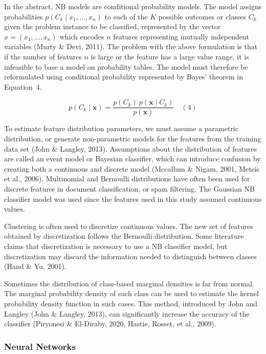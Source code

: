\documentclass[sn-mathphys-num]{sn-jnl}%
\begin{document}
In the abstract, NB models are conditional probability models. The model assigns probabilities $p(C_{k}\mid x_{1},\ldots, x_{n})$ to each of the $K$ possible outcomes or classes $C_{k}$ given the problem instance to be classified, represented by the vector $x = (x_{1},\ldots, x_{n})$ which encodes $n$ features representing mutually independent variables (Murty & Devi, 2011). The problem with the above formulation is that if the number of features $n$ is large or the feature has a large value range, it is infeasible to base a model on probability tables. The model must therefore be reformulated using conditional probability represented by Bayes' theorem in Equation~4.

\begin{equation}
	p(C_{k}\mid \mathbf{x})={\frac{p(C_{k})\ p(\mathbf{x} \mid C_{k})}{p(\mathbf{x})}}
	\quad\left(4\right)
\end{equation}

To estimate feature distribution parameters, we must assume a parametric distribution, or generate non-parametric models for the features from the training data set (John & Langley, 2013). Assumptions about the distribution of features are called an event model or Bayesian classifier, which can introduce confusion by creating both a continuous and discrete model (Mccallum & Nigam, 2001, Metsis et al., 2006). Multinomial and Bernoulli distributions have often been used for discrete features in document classification, or spam filtering. The Gaussian NB classifier model was used since the features used in this study assumed continuous values.

Clustering is often used to discretize continuous values. The new set of features obtained by discretization follows the Bernoulli distribution. Some literature claims that discretization is necessary to use a NB classifier model, but discretization may discard the information needed to distinguish between classes (Hand & Yu, 2001).

Sometimes the distribution of class-based marginal densities is far from normal. The marginal probability density of each class can be used to estimate the kernel probability density function in such cases. This method, introduced by John and Langley (John & Langley, 2013), can significantly increase the accuracy of the classifier (Piryonesi & El-Diraby, 2020, Hastie, Rosset, et al., 2009).

\subsubsection{Neural Networks}
\end{document}
